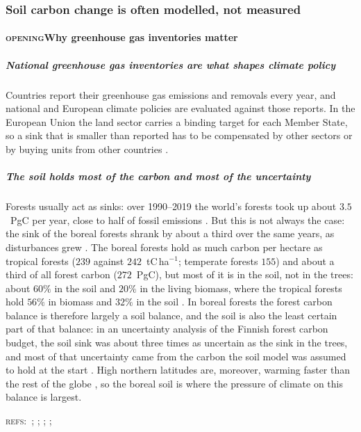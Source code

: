 \documentclass[11pt]{article}
\newcommand{\beat}[1]{\textcolor{black!45}{\textsc{\small #1}}\enspace}
\newcommand{\refs}[1]{\par\textcolor{red!70!black}{\footnotesize\textsc{refs:}\ #1}\par}
\begin{document}
\subsubsection{Soil carbon change is often modelled, not measured}
\paragraph{\beat{opening}Why greenhouse gas inventories matter}
\subparagraph{National greenhouse gas inventories are what shapes climate policy}
Countries report their greenhouse gas emissions and removals every year, and national and
European climate policies are evaluated against those reports. In the European Union the land
sector carries a binding target for each Member State, so a sink that is smaller than reported
has to be compensated by other sectors or by buying units from other countries
\citep{EU2018_841}.

\subparagraph{The soil holds most of the carbon and most of the uncertainty}
Forests usually act as sinks: over 1990--2019 the world's forests took
up about $3.5$~PgC per year, close to half of fossil emissions \citep{Pan2024}. But this is not
always the case: the sink of the boreal forests
shrank by about a third over the same years, as disturbances grew \citep{Pan2024}. The boreal
forests hold as much carbon per hectare as tropical forests ($239$ against
$242$~tC\,ha$^{-1}$; temperate forests $155$) and about a third of all forest carbon ($272$~PgC),
but most of it is in the soil, not in the trees: about $60\%$ in the soil and $20\%$ in the living
biomass, where the tropical forests hold $56\%$ in biomass and $32\%$ in the soil \citep{Pan2011}.
In boreal forests the forest carbon balance is therefore largely a soil balance, and the soil is
also the least certain part of that balance: in an uncertainty analysis of the Finnish forest
carbon budget, the soil sink was about three times as uncertain as the sink in the trees, and most
of that uncertainty came from the carbon the soil model was assumed to hold at the start
\citep{Peltoniemi2006}. High northern latitudes are,
moreover, warming faster than the rest of the globe \citep{IPCC2021SPM, Rantanen2022}, so the
boreal soil is where the pressure of climate on this balance is largest.
\refs{\citet{Pan2024}; \citet{Pan2011}; \citet{Peltoniemi2006};
\citet{IPCC2021SPM}; \citet{Rantanen2022}}
\end{document}
